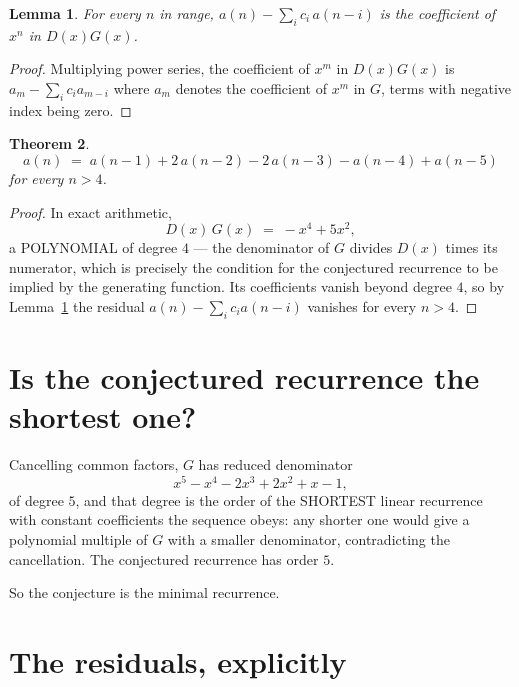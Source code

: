 \documentclass[11pt,a4paper]{article}
\theoremstyle{plain}
\newtheorem{theorem}{Theorem}
\newtheorem{lemma}[theorem]{Lemma}
\theoremstyle{definition}
\begin{document}
\begin{lemma}\label{lem:key}
For every $n$ in range, $a(n)-\sum_i c_i\,a(n-i)$ is the coefficient of $x^{n}$ in
$D(x)G(x)$.
\end{lemma}

\begin{proof}
Multiplying power series, the coefficient of $x^{m}$ in $D(x)G(x)$ is
$a_m-\sum_i c_i a_{m-i}$ where $a_m$ denotes the coefficient of $x^{m}$ in $G$, terms with
negative index being zero.
\end{proof}

\begin{theorem}
\[
a(n)\;=\;a(n-1) + 2\,a(n-2) - 2\,a(n-3) - a(n-4) + a(n-5)
\]
for every $n>4$.
\end{theorem}

\begin{proof}
In exact arithmetic,
\[
D(x)\,G(x)\;=\;- x^{4} + 5 x^{2},
\]
a POLYNOMIAL of degree $4$ --- the denominator of $G$ divides $D(x)$ times its numerator,
which is precisely the condition for the conjectured recurrence to be implied by the
generating function. Its coefficients vanish beyond degree $4$, so by
Lemma~\ref{lem:key} the residual $a(n)-\sum_ic_ia(n-i)$ vanishes for every
$n>4$.
\end{proof}

\section{Is the conjectured recurrence the shortest one?}

Cancelling common factors, $G$ has reduced denominator
\[
x^{5} - x^{4} - 2 x^{3} + 2 x^{2} + x - 1,
\]
of degree $5$, and that degree is the order of the SHORTEST linear recurrence with
constant coefficients the sequence obeys: any shorter one would give a polynomial multiple of
$G$ with a smaller denominator, contradicting the cancellation. The conjectured recurrence has
order $5$.

So the conjecture is the minimal recurrence.

\section{The residuals, explicitly}
\end{document}
